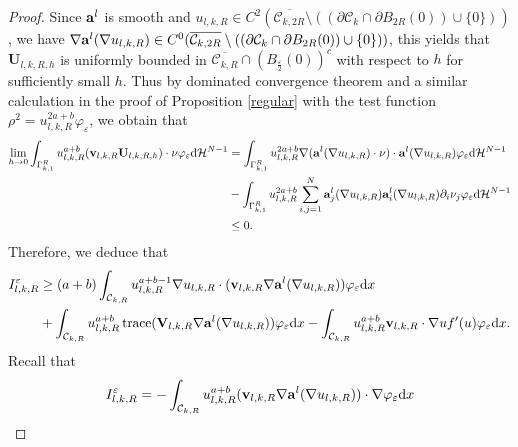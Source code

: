 \documentclass[12pt]{amsart}
\theoremstyle{definition}
\theoremstyle{remark}
\theoremstyle{conclusion}
\theoremstyle{conjecture}
\numberwithin{equation}{section}
\begin{document}
\begin{proof}
 Since ${\bf{a}}^l$ is smooth and $u_{l,k,R}\in C^2(\overline{\mathcal{C}_{k,2R}}\setminus((\partial\mathcal{C}_k\cap\partial B_{2R}(0))\cup\{0\}))$, we have $\nabla {\bf{a}}^l(\nabla u_{l,k,R})\in C^0(\overline{\mathcal{C}_{k,2R}}\setminus((\partial\mathcal{C}_k\cap\partial B_{2R}(0))\cup\{0\}))$, this yields that $\mathbf{U}_{l,k,R,h}$ is uniformly bounded in $\overline{\mathcal{C}_{k,R}}\cap (B_{\frac{\varepsilon}{2}}(0))^c$ with respect to $h$ for sufficiently small $h$.
Thus by dominated convergence theorem and a similar calculation in the proof of Proposition \ref{regular} with the test function $\rho^2=u_{l,k,R}^{2a+b}\varphi_{\varepsilon}$, we obtain that
\begin{equation*}
  \begin{aligned}
    \lim\limits_{h\rightarrow0}\int_{\Gamma_{k,1}^R} u_{l,k,R}^{a+b}(\mathbf{v}_{l,k,R}\mathbf{U}_{l,k,R,h})\cdot\nu\varphi_{\varepsilon}\mathrm{d}\mathcal{H}^{N-1}
    &=\int_{\Gamma_{k,1}^R}u_{l,k,R}^{2a+b}\nabla({\bf{a}}^l(\nabla u_{l,k,R})\cdot\nu)\cdot {\bf{a}}^l(\nabla u_{l,k,R})\varphi_{\varepsilon}\mathrm{d}\mathcal{H}^{N-1}\\
    &-\int_{\Gamma_{k,1}^R}u_{l,k,R}^{2a+b}\sum_{i,j=1}^{N}{\bf{a}}^l_j(\nabla u_{l,k,R}){\bf{a}}^l_i(\nabla u_{l,k,R})\partial_i\nu_j\varphi_{\varepsilon}\mathrm{d}\mathcal{H}^{N-1}\\
    &\leq0.
  \end{aligned}
\end{equation*}
Therefore, we deduce that
\begin{equation}\label{Iepi}
\begin{aligned}
  I^{\varepsilon}_{l,k,R}
  &\geq(a+b) \int_{\mathcal{C}_{k,R}}u_{l,k,R}^{a+b-1}\nabla u_{l,k,R}\cdot (\mathbf{v}_{l,k,R}\nabla {\bf{a}}^l(\nabla u_{l,k,R}))\varphi_{\varepsilon}\mathrm{d}x\\
  &+\int_{\mathcal{C}_{k,R}}u_{l,k,R}^{a+b}\operatorname{trace}(\mathbf{V}_{l,k,R}\nabla {\bf{a}}^l(\nabla u_{l,k,R}))\varphi_{\varepsilon}\mathrm{d}x
  -\int_{\mathcal{C}_{k,R}}u_{l,k,R}^{a+b}\mathbf{v}_{l,k,R}\cdot \nabla u f^{\prime}(u)\varphi_{\varepsilon}\mathrm{d}x.
\end{aligned}
\end{equation}
Recall that
\begin{equation*}
  \begin{aligned}
 I^{\varepsilon}_{l,k,R}
 &=-\int_{\mathcal{C}_{k,R}}u_{l,k,R}^{a+b}(\mathbf{v}_{l,k,R}\nabla {\bf{a}}^l(\nabla u_{l,k,R}))\cdot\nabla\varphi_{\varepsilon}\mathrm{d}x\\

\end{aligned}
\end{equation*}
\end{proof}
\end{document}
